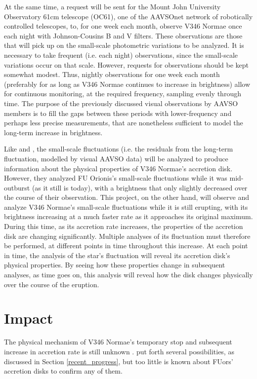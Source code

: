 \documentclass[iop,apj,tighten]{emulateapj}
\begin{document}
At the same time, a request will be sent for the Mount John University Observatory 61cm telescope (OC61), one of the AAVSOnet network of robotically controlled telescopes, to, for one week each month, observe V346 Normae once each night with Johnson-Cousins B and V filters. These observations are those that will pick up on the small-scale photometric variations to be analyzed. It is necessary to take frequent (i.e. each night) observations, since the small-scale variations occur on that scale. However, requests for observations should be kept somewhat modest. Thus, nightly observations  for one week each month (preferably for as long as V346 Normae continues to increase in brightness) allow for continuous monitoring, at the required frequency, sampling evenly through time. The purpose of the previously discussed visual observations by AAVSO members is to fill the gaps between these periods with lower-frequency and perhaps less precise measurements, that are nonetheless sufficient to model the long-term increase in brightness.

Like \cite{kenyon_flickering_2000} and \cite{siwak_photometric_2013}, the small-scale fluctuations (i.e. the residuals from the long-term fluctuation, modelled by visual AAVSO data) will be analyzed to produce information about the physical properties of V346 Normae's accretion disk. However, they analyzed FU Orionis's small-scale fluctuations while it was mid-outburst (as it still is today), with a brightness that only slightly decreased over the course of their observation. This project, on the other hand, will observe and analyze V346 Normae's small-scale fluctuations while it is still erupting, with its brightness increasing at a much faster rate as it approaches its original maximum. During this time, as its accretion rate increases, the properties of the accretion disk are changing significantly. Multiple analyses of its fluctuation must therefore be performed, at different points in time throughout this increase. At each point in time, the analysis of the star's fluctuation will reveal its accretion disk's physical properties. By seeing how these properties change in subsequent analyses, as time goes on, this analysis will reveal how the disk changes physically over the course of the eruption.

\section{Impact}
The physical mechanism of V346 Normae's temporary stop and subsequent increase in accretion rate is still unknown \citep{kospal2017brightness}. \cite{ninan2015v899} put forth several possibilities, as discussed in Section \ref{recent_progress}, but too little is known about FUors' accretion disks to confirm any of them.
\end{document}
